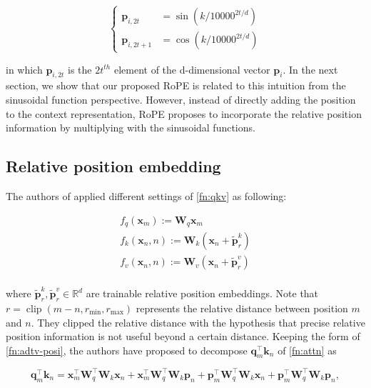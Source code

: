 \begin{equation}
	\begin{cases}
		{\boldsymbol p}_{i,2t}&=\sin(k/10000^{2t/d})\\
		{\boldsymbol p}_{i,2t+1}&=\cos(k/10000^{2t/d})
	\end{cases}
	\label{fn:sins}
\end{equation}

in which ${\boldsymbol p}_{i,2t}$ is the $2t^{th}$ element of the d-dimensional vector ${\boldsymbol p}_i$. In the next section, we show that our proposed RoPE is related to this intuition from the sinusoidal function perspective. However, instead of directly adding the position to the context representation, RoPE proposes to incorporate the relative position information by multiplying with the sinusoidal functions.

\subsection{Relative position embedding} The authors of \cite{Shaw2018SelfAttentionWR} applied  different settings of \ref{fn:qkv} as following:

\begin{equation}
	\begin{aligned}
		f_q({\boldsymbol x}_m):={\boldsymbol W}_{q}{\boldsymbol x}_m\\
		f_k({\boldsymbol x}_n, n):={\boldsymbol W}_{k}({\boldsymbol x}_n+\tilde{{\boldsymbol p}}^k_r)\\
		f_v({\boldsymbol x}_n, n):={\boldsymbol W}_{v}({\boldsymbol x}_n+\tilde{{\boldsymbol p}}^v_r)\\
	\end{aligned}
	\label{fn:shaw}
\end{equation}

where $\tilde{{\boldsymbol p}}^k_r,\tilde{{\boldsymbol p}}^v_r\in\mathbb{R}^{d}$ are trainable relative position embeddings. Note that $r=\operatorname{clip}(m-n,r_{\text{min}},r_{\text{max}})$ represents the relative distance between position $m$ and $n$. They clipped the relative distance with the hypothesis that precise relative position information is not useful beyond a certain distance. Keeping the form of \ref{fn:adtv-posi}, the authors \cite{Dai2019TransformerXLAL} have proposed to decompose ${\boldsymbol q}_m^{\intercal}{\boldsymbol k}_n$ of \ref{fn:attn} as

\begin{equation}
	{\boldsymbol q}_m^{\intercal}{\boldsymbol k}_n={\boldsymbol x}_m^{\intercal}{\boldsymbol W}_q^{\intercal}{\boldsymbol W}_k{\boldsymbol x}_n+{\boldsymbol x}_m^{\intercal}{\boldsymbol W}_q^{\intercal}{\boldsymbol W}_k{\boldsymbol p}_n+{\boldsymbol p}_m^{\intercal}{\boldsymbol W}_q^{\intercal}{\boldsymbol W}_k{\boldsymbol x}_n+{\boldsymbol p}_m^{\intercal}{\boldsymbol W}_q^{\intercal}{\boldsymbol W}_k{\boldsymbol p}_n,
	\label{fn:rela-posi1}
\end{equation}

